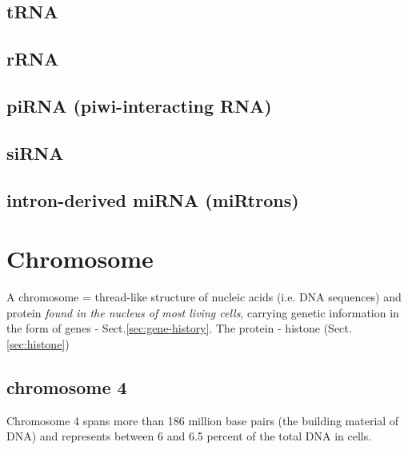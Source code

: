 

\subsection{tRNA}

\subsection{rRNA}

\subsection{piRNA (piwi-interacting RNA)}
\label{sec:piRNA}


\subsection{siRNA}
\label{sec:siRNA}


\subsection{intron-derived miRNA (miRtrons)}
\label{sec:miRtrons}



\section{Chromosome}
\label{sec:chromosome}

A chromosome = thread-like structure of nucleic acids (i.e. DNA sequences) and
protein {\it found in the nucleus of most living cells}, carrying genetic
information in the form of genes - Sect.\ref{sec:gene-history}.
The protein - histone (Sect.\ref{sec:histone})


\subsection{chromosome 4}
\label{sec:chromosome-4}

Chromosome 4 spans more than 186 million base pairs (the building material of
DNA) and represents between 6 and 6.5 percent of the total DNA in cells.

